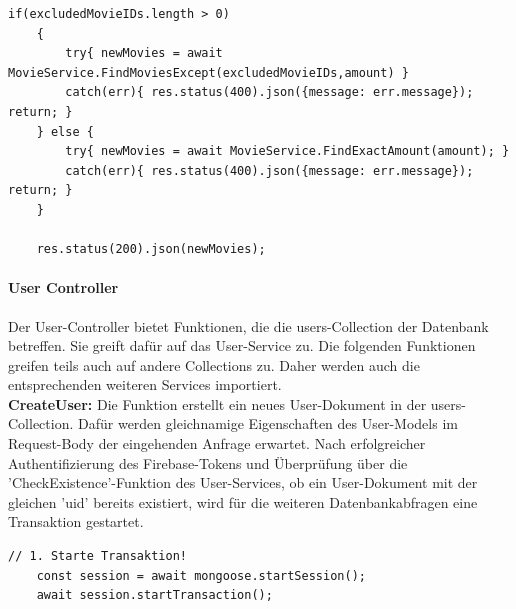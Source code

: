 \begin{lstlisting}[caption=MovieController - RequestMovie - Excluded Movies, label=lst:MovieControllerExcludedMovies]
    if(excludedMovieIDs.length > 0)
    {
        try{ newMovies = await MovieService.FindMoviesExcept(excludedMovieIDs,amount) } 
        catch(err){ res.status(400).json({message: err.message}); return; }
    } else {
        try{ newMovies = await MovieService.FindExactAmount(amount); } 
        catch(err){ res.status(400).json({message: err.message}); return; }
    }

    res.status(200).json(newMovies);
\end{lstlisting}




%
%



\paragraph{User Controller}
Der User-Controller bietet Funktionen, die die users-Collection der Datenbank betreffen. Sie greift dafür auf das User-Service zu. Die folgenden Funktionen greifen teils auch auf andere Collections zu. Daher werden auch die entsprechenden weiteren Services importiert.\\

\noindent
\textbf{CreateUser:}
Die Funktion erstellt ein neues User-Dokument in der users-Collection. Dafür werden gleichnamige Eigenschaften des User-Models im Request-Body der eingehenden Anfrage erwartet. Nach erfolgreicher Authentifizierung des Firebase-Tokens und Überprüfung über die 'CheckExistence'-Funktion des User-Services, ob ein User-Dokument mit der gleichen 'uid' bereits existiert, wird für die weiteren Datenbankabfragen eine Transaktion gestartet.\\

\begin{lstlisting}[caption=UserController - Create User - Transaktionsstart, label=lst:UserControllertransaction]
    // 1. Starte Transaktion!
    const session = await mongoose.startSession();
    await session.startTransaction();
\end{lstlisting}


